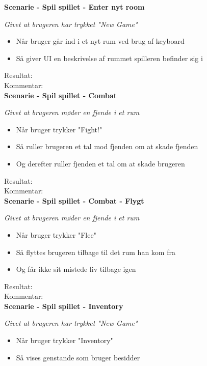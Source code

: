 \textbf{Scenarie - Spil spillet - Enter nyt room}

\textit{Givet at brugeren har trykket "New Game"}

\begin{itemize}
  \item Når bruger går ind i et nyt rum ved brug af keyboard
  \item Så giver UI en beskrivelse af rummet spilleren befinder sig i
\end{itemize}

Resultat:\\
Kommentar:\\

\textbf{Scenarie - Spil spillet - Combat}

\textit{Givet at brugeren møder en fjende i et rum}

\begin{itemize}
  \item Når bruger trykker "Fight!"
  \item Så ruller brugeren et tal mod fjenden om at skade fjenden
  \item Og derefter ruller fjenden et tal om at skade brugeren
\end{itemize}

Resultat:\\
Kommentar:\\

\textbf{Scenarie - Spil spillet - Combat - Flygt}

\textit{Givet at brugeren møder en fjende i et rum}

\begin{itemize}
  \item Når bruger trykker "Flee"
  \item Så flyttes brugeren tilbage til det rum han kom fra
  \item Og får ikke sit mistede liv tilbage igen
\end{itemize}

Resultat:\\
Kommentar:\\

\textbf{Scenarie - Spil spillet - Inventory}

\textit{Givet at brugeren har trykket "New Game"}

\begin{itemize}
  \item Når bruger trykker "Inventory"
  \item Så vises genstande som bruger besidder
\end{itemize}

